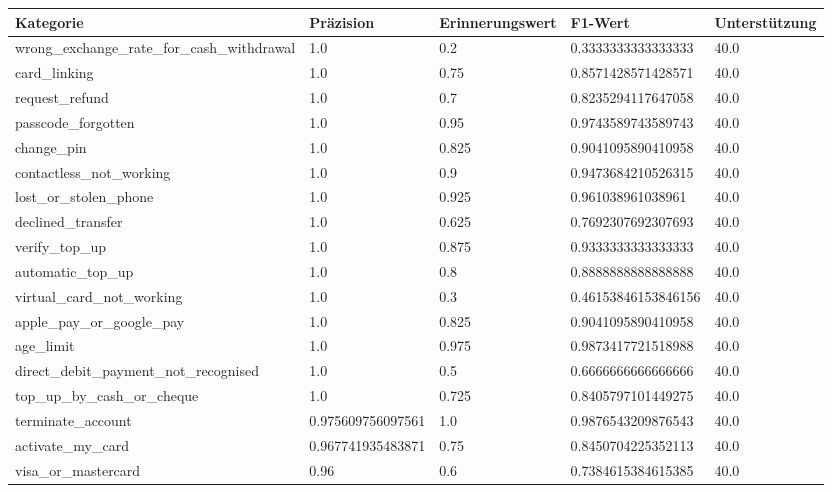 
    \begin{table}[!ht]
        \centering
        \begin{tabularx}{\textwidth}{X l l l l}
\toprule
\textbf{Kategorie} & \textbf{Präzision} & \textbf{Erinnerungswert} & \textbf{F1-Wert} & \textbf{Unterstützung} \\
\midrule
wrong\_exchange\_rate\_for\_cash\_withdrawal & \num{1.0} & \num{0.2} & \num{0.3333333333333333} & \num{40.0} \\
card\_linking & \num{1.0} & \num{0.75} & \num{0.8571428571428571} & \num{40.0} \\
request\_refund & \num{1.0} & \num{0.7} & \num{0.8235294117647058} & \num{40.0} \\
passcode\_forgotten & \num{1.0} & \num{0.95} & \num{0.9743589743589743} & \num{40.0} \\
change\_pin & \num{1.0} & \num{0.825} & \num{0.9041095890410958} & \num{40.0} \\
contactless\_not\_working & \num{1.0} & \num{0.9} & \num{0.9473684210526315} & \num{40.0} \\
lost\_or\_stolen\_phone & \num{1.0} & \num{0.925} & \num{0.961038961038961} & \num{40.0} \\
declined\_transfer & \num{1.0} & \num{0.625} & \num{0.7692307692307693} & \num{40.0} \\
verify\_top\_up & \num{1.0} & \num{0.875} & \num{0.9333333333333333} & \num{40.0} \\
automatic\_top\_up & \num{1.0} & \num{0.8} & \num{0.8888888888888888} & \num{40.0} \\
virtual\_card\_not\_working & \num{1.0} & \num{0.3} & \num{0.46153846153846156} & \num{40.0} \\
apple\_pay\_or\_google\_pay & \num{1.0} & \num{0.825} & \num{0.9041095890410958} & \num{40.0} \\
age\_limit & \num{1.0} & \num{0.975} & \num{0.9873417721518988} & \num{40.0} \\
direct\_debit\_payment\_not\_recognised & \num{1.0} & \num{0.5} & \num{0.6666666666666666} & \num{40.0} \\
top\_up\_by\_cash\_or\_cheque & \num{1.0} & \num{0.725} & \num{0.8405797101449275} & \num{40.0} \\
terminate\_account & \num{0.975609756097561} & \num{1.0} & \num{0.9876543209876543} & \num{40.0} \\
activate\_my\_card & \num{0.967741935483871} & \num{0.75} & \num{0.8450704225352113} & \num{40.0} \\
visa\_or\_mastercard & \num{0.96} & \num{0.6} & \num{0.7384615384615385} & \num{40.0} \\

\end{tabularx}
\end{table}
